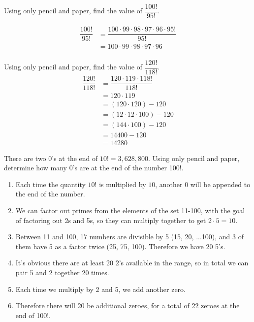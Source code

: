 \documentclass[openany, 12pt]{book}
\begin{document}
\begin{exercise}{}{}
	Using only pencil and paper, find the value of $\dfrac{100!}{95!}$.

	\begin{align*}
		\dfrac{100!}{95!} & = \dfrac{100\cdot 99 \cdot 98 \cdot 97 \cdot 96 \cdot 95!}{95!} \\
		                  & = 100\cdot 99 \cdot 98 \cdot 97 \cdot 96                        \\
	\end{align*}
\end{exercise}

\begin{exercise}{}{}
	Using only pencil and paper, find the value of $\dfrac{120!}{118!}$.
	\begin{align*}
		\dfrac{120!}{118!} & = \dfrac{120\cdot 119 \cdot 118!}{118!} \\
		                   & = 120\cdot 119                          \\
		                   & = (120 \cdot 120) - 120                 \\
		                   & = (12 \cdot 12 \cdot 100) - 120         \\
		                   & = (144 \cdot 100) - 120                 \\
		                   & = 14400 - 120                           \\
		                   & = 14280
	\end{align*}
\end{exercise}

\begin{exercise}{}{}
	There are two 0's at the end of $10! = 3,628,800$. Using
	only pencil and paper, determine how many 0's are at the end of the number
	100!.
	\begin{enumerate}[label={\textbullet}, leftmargin=*, itemsep=0pt, parsep=0pt]
		\item Each time the quantity $10!$ is multiplied by $10$, another $0$ will be
		      appended to the end of the number.
		\item We can factor out primes from the elements of the set 11-100, with the goal
		      of factoring out 2s and 5s, so they can multiply together to get
		      $2\cdot5=10$.
		\item Between 11 and 100, 17 numbers are divisible by 5 (15, 20, ...100), and 3
		      of them have 5 as a factor twice (25, 75, 100). Therefore we have 20 5's.
		\item It's obvious there are at least 20 2's available in the range, so in total
		      we can pair 5 and 2 together 20 times.
		\item Each time we multiply by 2 and 5, we add another zero.
		\item Therefore there will 20 be additional zeroes, for a total of 22 zeroes at the end
		      of 100!.
	\end{enumerate}
\end{exercise}
\end{document}
